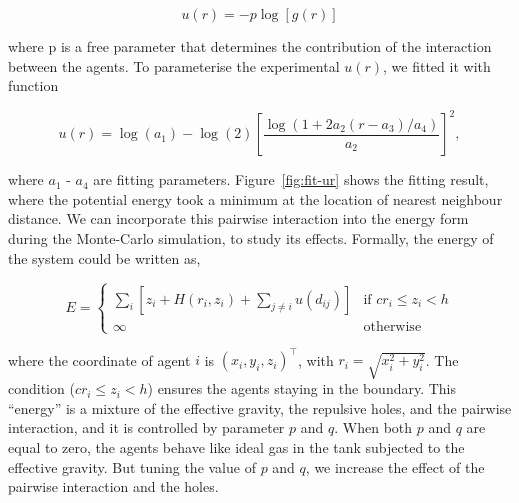 \documentclass[11pt,twoside]{report}
\begin{document}
\begin{equation*}
	u(r) = -p \log\left[ g(r) \right]
\end{equation*}

\noindent where \gls{p} is a free parameter that determines the contribution of the interaction between the agents. To parameterise the experimental $u(r)$, we fitted it with function

\begin{equation}
	u(r) = \log(a_1) - \log(2)\left[
		\frac{
			\log(1 + 2a_2(r-a_3)/a_4)
		}{a_2}
	\right]^2,
\label{eq:fit-ur}
\end{equation}


\noindent where $a_1$ - $a_4$ are fitting parameters. Figure~\ref{fig:fit-ur} shows the fitting result, where the potential energy took a minimum at the location of nearest neighbour distance.
We can incorporate this pairwise interaction into the energy form during the Monte-Carlo simulation, to study its effects. Formally, the energy of the system could be written as,


\begin{equation}
	E = \left\{ \begin{array}{ll}
		\sum_i\left[
			z_i + H(r_i, z_i) + 
			\sum_{j \neq i}{u(d_{ij})} 
			\right]
			&  \mbox{if $c r_i \le z_i < h$}\\
		\infty & \mbox{otherwise}
	\end{array}\right.
\label{eq:model-density}
\end{equation}



\noindent where the coordinate of agent $i$ is $(x_i, y_i, z_i)^\top$, with $r_i = \sqrt{x_i^2 + y_i^2}$. The condition ($c r_i \le z_i < h$) ensures the agents staying in the boundary. This ``energy'' is a mixture of the effective gravity, the repulsive holes, and the pairwise interaction, and it is controlled by parameter $p$ and $q$.
When both $p$ and $q$ are equal to zero, the agents behave like ideal gas in the tank subjected to the effective gravity. But tuning the value of $p$ and $q$, we increase the effect of the pairwise interaction and the holes.
\end{document}

